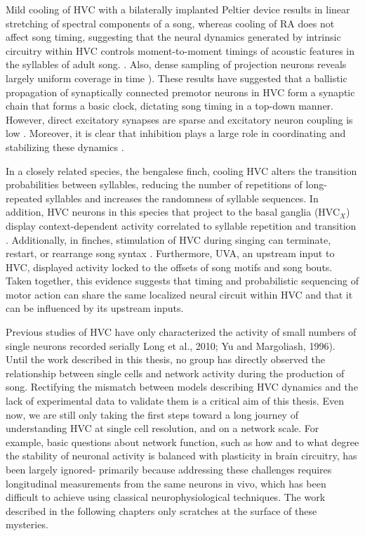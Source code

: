 Mild cooling of HVC with a bilaterally implanted Peltier device results in linear stretching of spectral components of a song, whereas cooling of RA does not affect song timing, suggesting that the neural dynamics generated by intrinsic circuitry within HVC controls moment-to-moment timings of acoustic features in the syllables of adult song. \cite{Long2008-go}  \cite{Fee2011-vs}. Also, dense sampling of projection neurons reveals largely uniform coverage in time \cite{Picardo2016-tj} \cite{Hahnloser2002-nl}). These results have suggested that a ballistic propagation of synaptically connected premotor neurons in HVC form a synaptic chain that forms a basic clock, dictating song timing in a top-down manner. 
However, direct excitatory synapses are sparse \cite{Kornfeld2017-lq} and excitatory neuron coupling is low \cite{Mooney2005-ev}. Moreover, it is clear that inhibition plays a large role in coordinating and stabilizing these dynamics \cite{Markowitz2013-ly}.

In a closely related species, the bengalese finch, cooling HVC alters the transition probabilities between syllables, reducing the number of repetitions of long-repeated syllables and increases the randomness of syllable sequences. In addition, HVC neurons in this species that project to the basal ganglia (HVC$_{X}$) display context-dependent activity correlated to syllable repetition and transition \cite{Wang2008-ml}. Additionally, in finches, stimulation of HVC during singing can terminate, restart, or rearrange song syntax \cite{Vu1998-gz}  \cite{Wang2008-ml}. Furthermore, UVA, an upstream input to HVC, displayed activity locked to the offsets of song motifs and song bouts. Taken together, this evidence suggests that timing and probabilistic sequencing of motor action can share the same localized neural circuit within HVC and that it can be influenced by its upstream inputs. 
 
	
Previous studies of HVC have only characterized the activity of small numbers of single neurons recorded serially \cite{Hahnloser2002-nl} \cite{Kozhevnikov2007-jz} Long et al., 2010; Yu and Margoliash, 1996). Until the work described in this thesis, no group has directly observed the relationship between single cells and network activity during the production of song. Rectifying the mismatch between models describing HVC dynamics and the lack of experimental data to validate them is a critical aim of this thesis. Even now, we are still only taking the first steps toward a long journey of understanding HVC at single cell resolution, and on a network scale. For example, basic questions about network function, such as how and to what degree the stability of neuronal activity is balanced with plasticity in brain circuitry, has been largely ignored- primarily because addressing these challenges requires longitudinal measurements from the same neurons in vivo, which has been difficult to achieve using classical neurophysiological techniques. The work described in the following chapters only scratches at the surface of these mysteries. 




